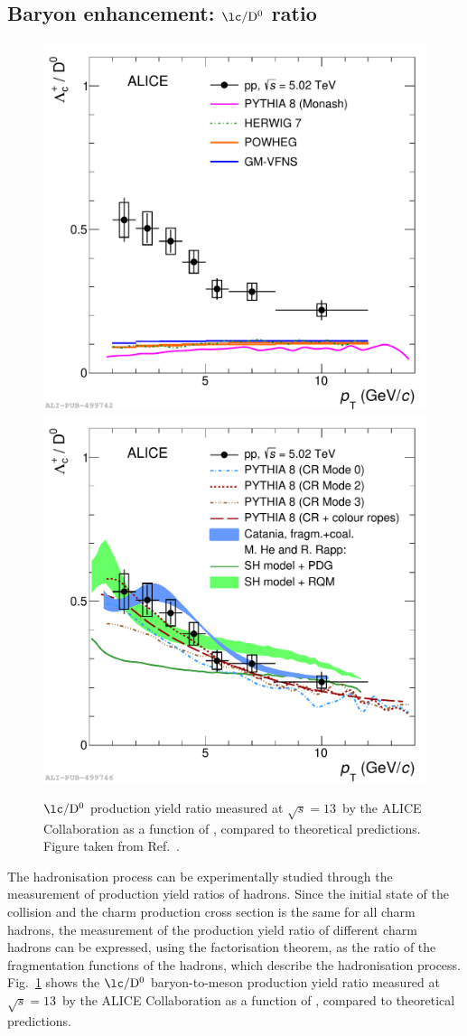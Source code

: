 \subsection{Baryon enhancement: \texorpdfstring{\boldmath$\mathrm{\lc/D^0}$}{Lc/D0} ratio}
\begin{figure}[htb]
    \centering
    \includegraphics[width=0.48\linewidth]{Figures/Chapter 2/LcD_models_withFFModels_ropes_2.pdf}
    \includegraphics[width=0.48\linewidth]{Figures/Chapter 2/LcD_models_withModifiedModels_ropes_coal_2.pdf}
    \caption{$\mathrm{\lc/D^0}$ production yield ratio measured at $\sqrt{s} = 13$~\tev by the ALICE Collaboration as a function of \pt, compared to theoretical predictions. Figure taken from Ref.~\cite{ALICE:2020wla}.}
    \label{fig:Lambda_c_D0}
\end{figure}
The hadronisation process can be experimentally studied through the measurement of production yield ratios of hadrons. Since the initial state of the collision and the charm production cross section is the same for all charm hadrons, the measurement of the production yield ratio of different charm hadrons can be expressed, using the factorisation theorem, as the ratio of the fragmentation functions of the hadrons, which describe the hadronisation process. Fig.~\ref{fig:Lambda_c_D0} shows the $\mathrm{\lc/D^0}$ baryon-to-meson production yield ratio measured at $\sqrt{s} = 13$~\tev by the ALICE Collaboration as a function of \pt, compared to theoretical predictions. 

